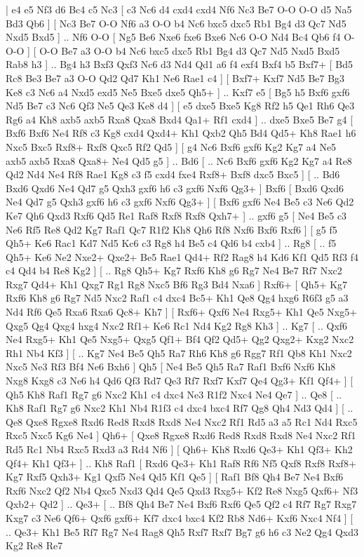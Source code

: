 \makegametitle 
|   e4   e5    Nf3   d6    Bc4   c5    Nc3 [  c3 Nc6  d4 cxd4  cxd4 Nf6  Nc3 Be7  O-O O-O  d5 Na5  Bd3 Qb6   ]  [  Nc3 Be7  O-O Nf6  a3 O-O  b4 Nc6  bxc5 dxc5  Rb1 Bg4  d3 Qc7  Nd5 Nxd5  Bxd5   ] .. Nf6   O-O [  Ng5 Be6  Nxe6 fxe6  Bxe6 Nc6  O-O Nd4  Bc4 Qb6  f4 O-O-O   ]  [  O-O Be7  a3 O-O  b4 Nc6  bxc5 dxc5  Rb1 Bg4  d3 Qc7  Nd5 Nxd5  Bxd5 Rab8  h3   ] .. Bg4    h3   Bxf3    Qxf3   Nc6    d3   Nd4    Qd1   a6    f4   exf4    Bxf4   b5    Bxf7+ [  Bd5 Rc8  Be3 Be7  a3 O-O  Qd2 Qd7  Kh1 Ne6  Rae1 c4   ]  [  Bxf7+ Kxf7  Nd5 Be7  Bg3 Ke8  c3 Nc6  a4 Nxd5  exd5 Ne5  Bxe5 dxe5  Qh5+   ] .. Kxf7    e5 [  Bg5 h5  Bxf6 gxf6  Nd5 Be7  c3 Nc6  Qf3 Ne5  Qe3 Ke8  d4   ]  [  e5 dxe5  Bxe5 Kg8  Rf2 h5  Qe1 Rh6  Qe3 Rg6  a4 Kh8  axb5 axb5  Rxa8 Qxa8  Bxd4 Qa1+  Rf1 cxd4   ] .. dxe5    Bxe5   Be7    g4 [  Bxf6 Bxf6  Ne4 Rf8  c3 Kg8  cxd4 Qxd4+  Kh1 Qxb2  Qh5 Bd4  Qd5+ Kh8  Rae1 h6  Nxc5 Bxc5  Rxf8+ Rxf8  Qxc5 Rf2  Qd5   ]  [  g4 Nc6  Bxf6 gxf6  Kg2 Kg7  a4 Ne5  axb5 axb5  Rxa8 Qxa8+  Ne4 Qd5  g5   ] .. Bd6 [ .. Nc6  Bxf6 gxf6  Kg2 Kg7  a4 Re8  Qd2 Nd4  Ne4 Rf8  Rae1 Kg8  c3 f5  cxd4 fxe4  Rxf8+ Bxf8  dxc5 Bxc5   ]  [ .. Bd6  Bxd6 Qxd6  Ne4 Qd7  g5 Qxh3  gxf6 h6  c3 gxf6  Nxf6 Qg3+   ]  Bxf6 [  Bxd6 Qxd6  Ne4 Qd7  g5 Qxh3  gxf6 h6  c3 gxf6  Nxf6 Qg3+   ]  [  Bxf6 gxf6  Ne4 Be5  c3 Ne6  Qd2 Ke7  Qh6 Qxd3  Rxf6 Qd5  Re1 Raf8  Rxf8 Rxf8  Qxh7+   ] .. gxf6    g5 [  Ne4 Be5  c3 Ne6  Rf5 Re8  Qd2 Kg7  Raf1 Qc7  R1f2 Kh8  Qh6 Rf8  Nxf6 Bxf6  Rxf6   ]  [  g5 f5  Qh5+ Ke6  Rac1 Kd7  Nd5 Kc6  c3 Rg8  h4 Be5  c4 Qd6  b4 cxb4   ] .. Rg8 [ .. f5  Qh5+ Ke6  Ne2 Nxe2+  Qxe2+ Be5  Rae1 Qd4+  Rf2 Rag8  h4 Kd6  Kf1 Qd5  Rf3 f4  c4 Qd4  b4 Re8  Kg2   ]  [ .. Rg8  Qh5+ Kg7  Rxf6 Kh8  g6 Rg7  Ne4 Be7  Rf7 Nxc2  Rxg7 Qd4+  Kh1 Qxg7  Rg1 Rg8  Nxc5 Bf6  Rg3 Bd4  Nxa6   ]  Rxf6+ [  Qh5+ Kg7  Rxf6 Kh8  g6 Rg7  Nd5 Nxc2  Raf1 c4  dxc4 Bc5+  Kh1 Qe8  Qg4 hxg6  R6f3 g5  a3 Nd4  Rf6 Qe5  Rxa6 Rxa6  Qc8+ Kh7   ]  [  Rxf6+ Qxf6  Ne4 Rxg5+  Kh1 Qe5  Nxg5+ Qxg5  Qg4 Qxg4  hxg4 Nxc2  Rf1+ Ke6  Rc1 Nd4  Kg2 Rg8  Kh3   ] .. Kg7 [ .. Qxf6  Ne4 Rxg5+  Kh1 Qe5  Nxg5+ Qxg5  Qf1+ Bf4  Qf2 Qd5+  Qg2 Qxg2+  Kxg2 Nxc2  Rh1 Nb4  Kf3   ]  [ .. Kg7  Ne4 Be5  Qh5 Ra7  Rh6 Kh8  g6 Rgg7  Rf1 Qb8  Kh1 Nxc2  Nxc5 Ne3  Rf3 Bf4  Ne6 Bxh6   ]  Qh5 [  Ne4 Be5  Qh5 Ra7  Raf1 Bxf6  Nxf6 Kh8  Nxg8 Kxg8  c3 Ne6  h4 Qd6  Qf3 Rd7  Qe3 Rf7  Rxf7 Kxf7  Qe4 Qg3+  Kf1 Qf4+   ]  [  Qh5 Kh8  Raf1 Rg7  g6 Nxc2  Kh1 c4  dxc4 Ne3  R1f2 Nxc4  Ne4 Qe7   ] .. Qe8 [ .. Kh8  Raf1 Rg7  g6 Nxc2  Kh1 Nb4  R1f3 c4  dxc4 bxc4  Rf7 Qg8  Qh4 Nd3  Qd4   ]  [ .. Qe8  Qxe8 Rgxe8  Rxd6 Red8  Rxd8 Rxd8  Ne4 Nxc2  Rf1 Rd5  a3 a5  Rc1 Nd4  Rxc5 Rxc5  Nxc5 Kg6  Ne4   ]  Qh6+ [  Qxe8 Rgxe8  Rxd6 Red8  Rxd8 Rxd8  Ne4 Nxc2  Rf1 Rd5  Rc1 Nb4  Rxc5 Rxd3  a3 Rd4  Nf6   ]  [  Qh6+ Kh8  Rxd6 Qe3+  Kh1 Qf3+  Kh2 Qf4+  Kh1 Qf3+   ] .. Kh8   Raf1 [  Rxd6 Qe3+  Kh1 Raf8  Rf6 Nf5  Qxf8 Rxf8  Rxf8+ Kg7  Rxf5 Qxh3+  Kg1 Qxf5  Ne4 Qd5  Kf1 Qe5   ]  [  Raf1 Bf8  Qh4 Be7  Ne4 Bxf6  Rxf6 Nxc2  Qf2 Nb4  Qxc5 Nxd3  Qd4 Qe5  Qxd3 Rxg5+  Kf2 Re8  Nxg5 Qxf6+  Nf3 Qxb2+  Qd2   ] .. Qe3+ [ .. Bf8  Qh4 Be7  Ne4 Bxf6  Rxf6 Qe5  Qf2 c4  Rf7 Rg7  Rxg7 Kxg7  c3 Ne6  Qf6+ Qxf6  gxf6+ Kf7  dxc4 bxc4  Kf2 Rb8  Nd6+ Kxf6  Nxc4 Nf4   ]  [ .. Qe3+  Kh1 Be5  Rf7 Rg7  Ne4 Rag8  Qh5 Rxf7  Rxf7 Bg7  g6 h6  c3 Ne2  Qg4 Qxd3  Kg2 Re8  Re7 